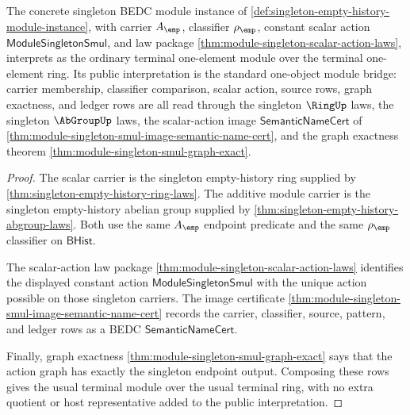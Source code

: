 \begin{theorem}
\label{thm:module-singleton-standard-bridge}
The concrete singleton BEDC module instance of
\autoref{def:singleton-empty-history-module-instance}, with carrier
$A_{\emp}$, classifier $\rho_{\emp}$, constant scalar action
$\mathsf{ModuleSingletonSmul}$, and law package
\autoref{thm:module-singleton-scalar-action-laws}, interprets as the ordinary
terminal one-element module over the terminal one-element ring. Its public
interpretation is the standard one-object module bridge: carrier membership,
classifier comparison, scalar action, source rows, graph exactness, and ledger
rows are all read through the singleton $\RingUp$ laws, the singleton
$\AbGroupUp$ laws, the scalar-action image
$\mathsf{SemanticNameCert}$ of
\autoref{thm:module-singleton-smul-image-semantic-name-cert}, and the graph
exactness theorem \autoref{thm:module-singleton-smul-graph-exact}.
\end{theorem}
\begin{proof}
The scalar carrier is the singleton empty-history ring supplied by
\autoref{thm:singleton-empty-history-ring-laws}. The additive module carrier is
the singleton empty-history abelian group supplied by
\autoref{thm:singleton-empty-history-abgroup-laws}. Both use the same
$A_{\emp}$ endpoint predicate and the same $\rho_{\emp}$ classifier on
$\mathsf{BHist}$.

The scalar-action law package
\autoref{thm:module-singleton-scalar-action-laws} identifies the displayed
constant action $\mathsf{ModuleSingletonSmul}$ with the unique action possible
on those singleton carriers. The image certificate
\autoref{thm:module-singleton-smul-image-semantic-name-cert} records the
carrier, classifier, source, pattern, and ledger rows as a BEDC
$\mathsf{SemanticNameCert}$.

Finally, graph exactness
\autoref{thm:module-singleton-smul-graph-exact} says that the action graph has
exactly the singleton endpoint output. Composing these rows gives the usual
terminal module over the usual terminal ring, with no extra quotient or host
representative added to the public interpretation.
\end{proof}

